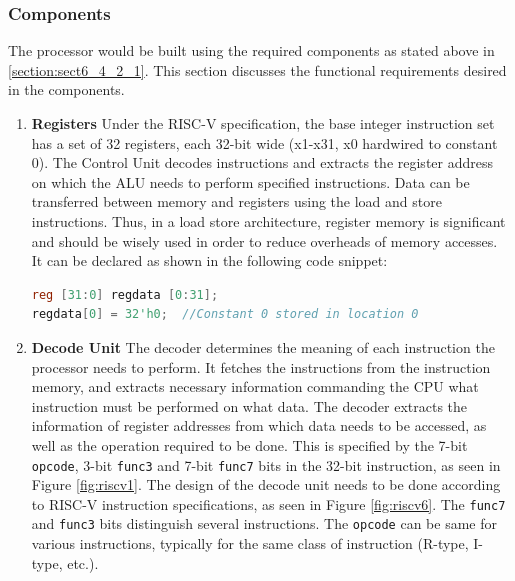 \subsubsection{Components}
\label{sect6_4_2_2}
The processor would be built using the required components as stated above in \ref{section:sect6_4_2_1}. This section discusses the functional requirements desired in the components.

\begin{enumerate}
\item \textbf{Registers} \newline
Under the RISC-V specification, the base integer instruction set has a set of 32 registers, each 32-bit wide (x1-x31, x0 hardwired to constant 0). The Control Unit decodes instructions and extracts the register address on which the ALU needs to perform specified instructions. Data can be transferred between memory and registers using the load and store instructions. Thus, in a load store architecture, register memory is significant and should be wisely used in order to reduce overheads of memory accesses. It can be declared as shown in the following code snippet:

\begin{lstlisting}[language=Verilog]
reg [31:0] regdata [0:31];
regdata[0] = 32'h0;  //Constant 0 stored in location 0
\end{lstlisting}

\item \textbf{Decode Unit} \newline
The decoder determines the meaning of each instruction the processor needs to perform. It fetches the instructions from the instruction memory, and extracts necessary information commanding the CPU what instruction must be performed on what data. \newline\newline
The decoder extracts the information of register addresses from which data needs to be accessed, as well as the operation required to be done. This is specified by the 7-bit \verb|opcode|, 3-bit \verb|func3| and 7-bit \verb|func7| bits in the 32-bit instruction, as seen in Figure \ref{fig:riscv1}.\newline\newline
The design of the decode unit needs to be done according to RISC-V instruction specifications, as seen in Figure \ref{fig:riscv6}. The \verb|func7| and \verb|func3| bits  distinguish several instructions. The \verb|opcode| can be same for various instructions, typically for the same class of instruction (R-type, I-type, etc.).


\end{enumerate}
